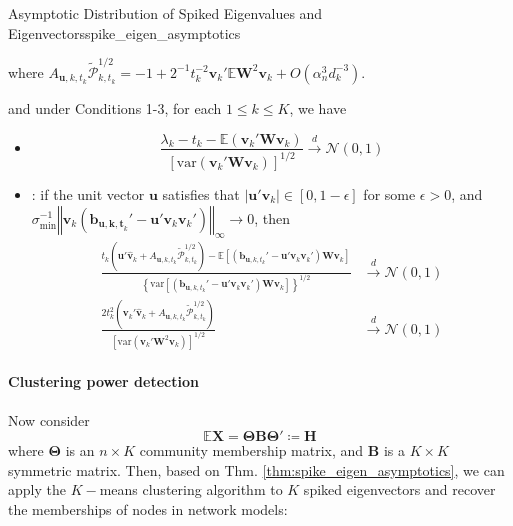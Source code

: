\documentclass[twoside]{article}
\begin{document}
\begin{theorem}{Asymptotic Distribution of Spiked Eigenvalues and Eigenvectors}{spike_eigen_asymptotics}
\begin{itemize}
\begin{equation*}
        \end{equation*}
        where $A_{\mathbf{u},k,t_k}\tilde{\mathcal{P}}_{k,t_k}^{1/2} = -1 + 2^{-1} t_k^{-2} \mathbf{v}_k' \mathbb{E}\mathbf{W}^2 \mathbf{v}_k + O(\alpha_n^3 d_k^{-3})$.
    \end{itemize}
    and under Conditions 1-3, for each $1\leq k \leq K$, we have 
    \begin{itemize}
        \item {} $$ \frac{\lambda_k - t_k - \mathbb{E}\left(\mathbf{v}_k'\mathbf{W}\mathbf{v}_k\right)}{\left[\mathrm{var}\left(\mathbf{v}_k'\mathbf{W}\mathbf{v}_k\right)\right]^{1/2}} \xrightarrow{d}\mathcal{N}(0,1) $$
        \item {}: if the unit vector $\mathbf{u}$ satisfies that $\left\vert \mathbf{u}'\mathbf{v}_k \right\vert \in \left[0,1-\epsilon\right]$ for some $\epsilon>0$, and $\sigma_{\min}^{-1}\left\Vert \mathbf{v}_k\left(\mathbf{b}_{\mathbf{u,k,t}_k}'-\mathbf{u}'\mathbf{v}_k\mathbf{v}_k'\right) \right\Vert _{\infty} \rightarrow 0$, then 
        \begin{align*}
            \frac{t_k\left( \mathbf{u}'\hat{\mathbf{v}}_k + A_{\mathbf{u},k,t_k}\tilde{\mathcal{P}}^{1/2}_{k,t_k} \right) - \mathbb{E}\left[ \left( \mathbf{b}_{\mathbf{u},k,t_k}' - \mathbf{u}' \mathbf{v}_k\mathbf{v}_k' \right) \mathbf{Wv}_k \right] }{ \left\{ \mathrm{var} \left[ \left( \mathbf{b}_{\mathbf{u},k,t_k}' - \mathbf{u}' \mathbf{v}_k\mathbf{v}_k' \right) \mathbf{Wv}_k \right] \right\}^{1/2}} &\xrightarrow{d}\mathcal{N}(0,1)\\
            \frac{2t_k^2 \left( \mathbf{v}_k'\hat{\mathbf{v}}_k + A_{\mathbf{u},k,t_k} \tilde{\mathcal{P}}^{1/2}_{k,t_k} \right)}{ \left[ \mathrm{var}\left( \mathbf{v}_k' \mathbf{W}^2 \mathbf{v}_k \right) \right]^{1/2} } &\xrightarrow{d} \mathcal{N}(0,1)
        \end{align*}
    \end{itemize}
\end{theorem}

\paragraph*{Clustering power detection} Now consider 
$$
\mathbb{E}\mathbf{X} = \boldsymbol{\Theta \mathbf{B} \Theta}' \coloneq \mathbf{H}
$$
where $\boldsymbol{\Theta}$ is an $n\times K $ community membership matrix, and $\mathbf{B}$ is a $K\times K$ symmetric matrix. Then, based on Thm. \ref{thm:spike_eigen_asymptotics}, we can apply the $K-$means clustering algorithm to $K$ spiked eigenvectors and recover the memberships of nodes in network models:
\end{document}
